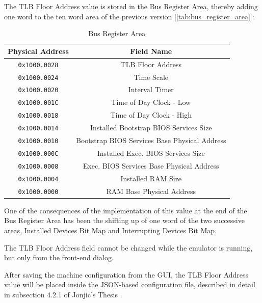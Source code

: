 \documentclass[12pt,a4paper,openright,twoside]{report}
\begin{document}
The TLB Floor Address value is stored in the Bus Register Area, thereby adding one word to the ten word area of the previous version [\autoref{tab:bus_register_area}]:
\begin{table}[h]
	\centering
	\begin{tabular}{|c|c|}
		\hline
		Physical Address     & Field Name                                    \\ \hline\hline
		\texttt{0x1000.0028} & TLB Floor Address                             \\ \hline
		\texttt{0x1000.0024} & Time Scale                                    \\ \hline
		\texttt{0x1000.0020} & Interval Timer                                \\ \hline
		\texttt{0x1000.001C} & Time of Day Clock - Low                       \\ \hline
		\texttt{0x1000.0018} & Time of Day Clock - High                      \\ \hline
		\texttt{0x1000.0014} & Installed Bootstrap BIOS Services Size        \\ \hline
		\texttt{0x1000.0010} & Bootstrap BIOS Services Base Physical Address \\ \hline
		\texttt{0x1000.000C} & Installed Exec. BIOS Services Size            \\ \hline
		\texttt{0x1000.0008} & Exec. BIOS Services Base Physical Address     \\ \hline
		\texttt{0x1000.0004} & Installed RAM Size                            \\ \hline
		\texttt{0x1000.0000} & RAM Base Physical Address                     \\ \hline
	\end{tabular}
	\caption{Bus Register Area}
	\label{tab:bus_register_area}
\end{table}

One of the consequences of the implementation of this value at the end of the Bus Register Area has been the shifting up of one word of the two successive areas, Installed Devices Bit Map and Interrupting Devices Bit Map.

The TLB Floor Address field cannot be changed while the emulator is running, but only from the front-end dialog.

After saving the machine configuration from the GUI, the TLB Floor Address value will be placed inside the JSON-based configuration file, described in detail in subsection 4.2.1 of Jonjic's Thesis \cite{tjonjic}.
\end{document}
